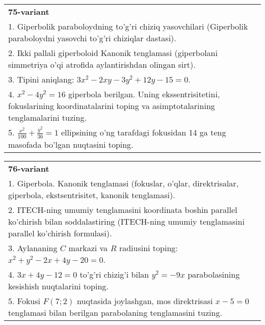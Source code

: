 \documentclass{article}
\begin{document}
\begin{tabular}{m{17cm}}
\textbf{75-variant}\\
1. Giperbolik paraboloydning to'g'ri chiziq yasovchilari (Giperbolik paraboloydni yasovchi to'g'ri chiziqlar dastasi).\\

2. Ikki pallali giperboloid Kanonik tenglamasi (giperbolani simmetriya o'qi atrofida aylantirishdan olingan sirt).\\

3. Tipini aniqlang: $3x^{2}-2xy-3y^{2}+12y-15=0$.\\

4. $x^{2} - 4y^{2} = 16$ giperbola berilgan. Uning ekssentrisitetini, fokuslarining koordinatalarini toping va asimptotalarining tenglamalarini tuzing.\\

5. $\frac{x^{2}}{100} + \frac{y^{2}}{36} = 1$ ellipsining o'ng tarafdagi fokusidan 14 ga teng masofada bo'lgan nuqtasini toping.  
\end{tabular}
\vspace{1cm}


\begin{tabular}{m{17cm}}
\textbf{76-variant}\\
1. Giperbola. Kanonik tenglamasi (fokuslar, o'qlar, direktrisalar, giperbola, ekstsentrisitet, kanonik tenglamasi).\\

2. ITECH-ning umumiy tenglamasini koordinata boshin parallel ko'chirish bilan soddalastiring (ITECH-ning umumiy tenglamasini parallel ko'chirish formulasi).\\

3. Aylananing $C$ markazi va $R$ radiusini toping: $x^2+y^2-2x+4y-20=0$.\\

4. $3x + 4y - 12 = 0$ to'g'ri chizig'i bilan $y^{2} = - 9x$ parabolasining kesishish nuqtalarini toping.  \\

5. Fokusi $F(7;2)$ nuqtasida joylashgan, mos direktrisasi $x - 5 = 0$ tenglamasi bilan berilgan parabolaning tenglamasini tuzing.  
\end{tabular}
\vspace{1cm}
\end{document}
